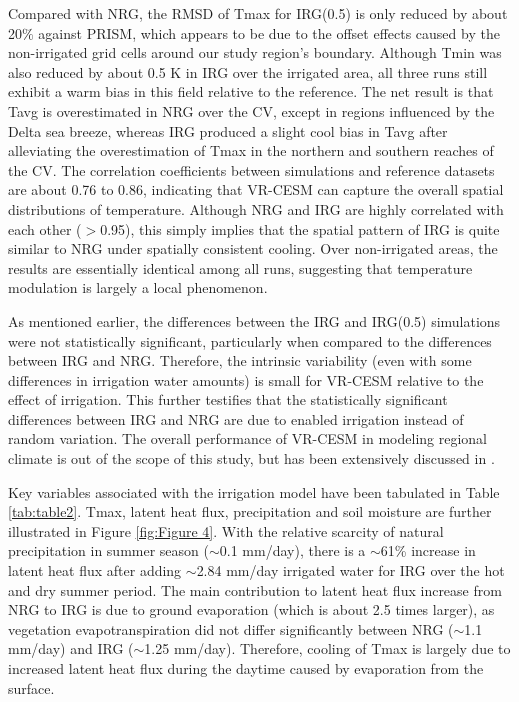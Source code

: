 \documentclass[draft,ms]{agutex}   %
\begin{document}
\begin{article}
Compared with NRG, the RMSD of Tmax for IRG(0.5) is only reduced by about 20$\%$ against PRISM, which appears to be due to the offset effects caused by the non-irrigated grid cells around our study region's boundary. Although Tmin was also reduced by about 0.5 K in IRG over the irrigated area, all three runs still exhibit a warm bias in this field relative to the reference. The net result is that Tavg is overestimated in NRG over the CV, except in regions influenced by the Delta sea breeze, whereas IRG produced a slight cool bias in Tavg after alleviating the overestimation of Tmax in the northern and southern reaches of the CV. The correlation coefficients between simulations and reference datasets are about 0.76 to 0.86, indicating that VR-CESM can capture the overall spatial distributions of temperature. Although NRG and IRG are highly correlated with each other ($>$0.95), this simply implies that the spatial pattern of IRG is quite similar to NRG under spatially consistent cooling. Over non-irrigated areas, the results are essentially identical among all runs, suggesting that temperature modulation is largely a local phenomenon.

As mentioned earlier, the differences between the IRG and IRG(0.5) simulations were not statistically significant, particularly when compared to the differences between IRG and NRG. Therefore, the intrinsic variability (even with some differences in irrigation water amounts) is small for VR-CESM relative to the effect of irrigation. This further testifies that the statistically significant differences between IRG and NRG are due to enabled irrigation instead of random variation. The overall performance of VR-CESM in modeling regional climate is out of the scope of this study, but has been extensively discussed in \citep{huang2016evaluation}.

Key variables associated with the irrigation model have been tabulated in Table \ref{tab:table2}. Tmax, latent heat flux, precipitation and soil moisture are further illustrated in Figure \ref{fig:Figure 4}. With the relative scarcity of natural precipitation in summer season ($\sim$0.1 mm/day), there is a $\sim$61\% increase in latent heat flux after adding $\sim$2.84 mm/day irrigated water for IRG over the hot and dry summer period. The main contribution to latent heat flux increase from NRG to IRG is due to ground evaporation (which is about 2.5 times larger), as vegetation evapotranspiration did not differ significantly between NRG ($\sim$1.1 mm/day) and IRG ($\sim$1.25 mm/day). Therefore, cooling of Tmax is largely due to increased latent heat flux during the daytime caused by evaporation from the surface. 


\end{article}
\end{document}
